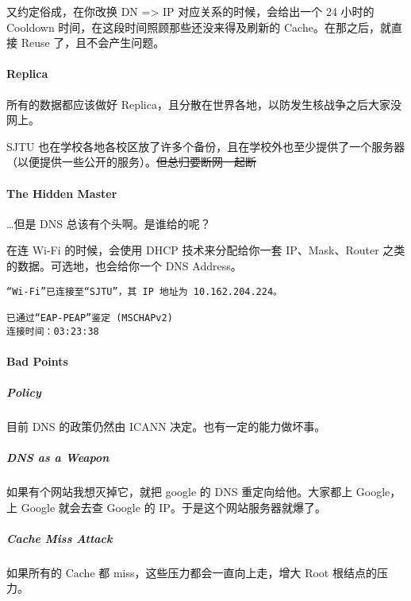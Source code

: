 \documentclass[
]{article}
\begin{document}
又约定俗成，在你改换 DN =\textgreater{} IP 对应关系的时候，会给出一个 24
小时的 Cooldown 时间，在这段时间照顾那些还没来得及刷新的
Cache。在那之后，就直接 Reuse 了，且不会产生问题。

\hypertarget{header-n157}{%
\paragraph{Replica}\label{header-n157}}

所有的数据都应该做好
Replica，且分散在世界各地，以防发生核战争之后大家没网上。

SJTU
也在学校各地各校区放了许多个备份，且在学校外也至少提供了一个服务器（以便提供一些公开的服务）。\sout{但总归要断网一起断}

\hypertarget{header-n160}{%
\paragraph{The Hidden Master}\label{header-n160}}

\ldots 但是 DNS 总该有个头啊。是谁给的呢？

在连 Wi-Fi 的时候，会使用 DHCP 技术来分配给你一套 IP、Mask、Router
之类的数据。可选地，也会给你一个 DNS Address。

\begin{verbatim}
“Wi-Fi”已连接至“SJTU”，其 IP 地址为 10.162.204.224。

已通过“EAP-PEAP”鉴定 (MSCHAPv2)
连接时间：03:23:38
\end{verbatim}

\hypertarget{header-n164}{%
\paragraph{Bad Points}\label{header-n164}}

\hypertarget{header-n165}{%
\subparagraph{Policy}\label{header-n165}}

目前 DNS 的政策仍然由 ICANN 决定。也有一定的能力做坏事。

\hypertarget{header-n167}{%
\subparagraph{DNS as a Weapon}\label{header-n167}}

如果有个网站我想灭掉它，就把 google 的 DNS 重定向给他。大家都上
Google，上 Google 就会去查 Google 的 IP。于是这个网站服务器就爆了。

\hypertarget{header-n169}{%
\subparagraph{Cache Miss Attack}\label{header-n169}}

如果所有的 Cache 都 miss，这些压力都会一直向上走，增大 Root
根结点的压力。
\end{document}
